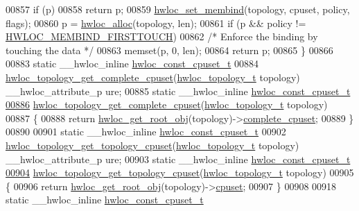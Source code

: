 \begin{DoxyCode}
00857   \textcolor{keywordflow}{if} (p)
00858     \textcolor{keywordflow}{return} p;
00859   \hyperlink{a00050_ga8b6d1d90227aff8e44ef26bc1f8a8f95}{hwloc_set_membind}(topology, cpuset, policy, flags);
00860   p = \hyperlink{a00050_gac5586e58cf25c3596b7d4aa31ce13259}{hwloc_alloc}(topology, len);
00861   \textcolor{keywordflow}{if} (p && policy != \hyperlink{a00050_ggac9764f79505775d06407b40f5e4661e8a979c7aa78dd32780858f30f47a72cca0}{HWLOC_MEMBIND_FIRSTTOUCH})
00862     \textcolor{comment}{/* Enforce the binding by touching the data */}
00863     memset(p, 0, len);
00864   \textcolor{keywordflow}{return} p;
00865 \}
00866 
00883 \textcolor{keyword}{static} \_\_hwloc\_inline \hyperlink{a00040_ga1f784433e9b606261f62d1134f6a3b25}{hwloc_const_cpuset_t}
00884 \hyperlink{a00060_ga418ebb39eaf1eac8f9cf4047cf59a534}{hwloc_topology_get_complete_cpuset}(\hyperlink{a00039_ga9d1e76ee15a7dee158b786c30b6a6e38}{hwloc_topology_t} topology) \_\_hwloc\_attribute\_p
      ure;
00885 \textcolor{keyword}{static} \_\_hwloc\_inline \hyperlink{a00040_ga1f784433e9b606261f62d1134f6a3b25}{hwloc_const_cpuset_t}
\hypertarget{a00031_source_l00886}{}\hyperlink{a00060_ga418ebb39eaf1eac8f9cf4047cf59a534}{00886} \hyperlink{a00060_ga418ebb39eaf1eac8f9cf4047cf59a534}{hwloc_topology_get_complete_cpuset}(\hyperlink{a00039_ga9d1e76ee15a7dee158b786c30b6a6e38}{hwloc_topology_t} topology)
00887 \{
00888   \textcolor{keywordflow}{return} \hyperlink{a00053_gadbf58f6e187efbdb3cd9a8e30311b7d7}{hwloc_get_root_obj}(topology)->\hyperlink{a00016_a91788a9da687beb7224cc1fd7b75208c}{complete_cpuset};
00889 \}
00890 
00901 \textcolor{keyword}{static} \_\_hwloc\_inline \hyperlink{a00040_ga1f784433e9b606261f62d1134f6a3b25}{hwloc_const_cpuset_t}
00902 \hyperlink{a00060_gaa319133e702fea664750c45735ac8a25}{hwloc_topology_get_topology_cpuset}(\hyperlink{a00039_ga9d1e76ee15a7dee158b786c30b6a6e38}{hwloc_topology_t} topology) \_\_hwloc\_attribute\_p
      ure;
00903 \textcolor{keyword}{static} \_\_hwloc\_inline \hyperlink{a00040_ga1f784433e9b606261f62d1134f6a3b25}{hwloc_const_cpuset_t}
\hypertarget{a00031_source_l00904}{}\hyperlink{a00060_gaa319133e702fea664750c45735ac8a25}{00904} \hyperlink{a00060_gaa319133e702fea664750c45735ac8a25}{hwloc_topology_get_topology_cpuset}(\hyperlink{a00039_ga9d1e76ee15a7dee158b786c30b6a6e38}{hwloc_topology_t} topology)
00905 \{
00906   \textcolor{keywordflow}{return} \hyperlink{a00053_gadbf58f6e187efbdb3cd9a8e30311b7d7}{hwloc_get_root_obj}(topology)->\hyperlink{a00016_a67925e0f2c47f50408fbdb9bddd0790f}{cpuset};
00907 \}
00908 
00918 \textcolor{keyword}{static} \_\_hwloc\_inline \hyperlink{a00040_ga1f784433e9b606261f62d1134f6a3b25}{hwloc_const_cpuset_t}

\end{DoxyCode}

